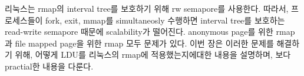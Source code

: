 \ifkor
리눅스는 rmap의 interval tree를 보호하기 위해 rw semapore를 사용한다. 
따라서, 프로세스들이 fork, exit, mmap를 simultaneosly 수행하면 interval tree를 보호하는
read-write semapore 때문에 scalability가 떨어진다.
anonymous page를 위한 rmap과 file mapped page을 위한 rmap 모두 문제가 있다.
이번 장은 이러한 문제를 해결하기 위해, 어떻게 LDU를 리눅스의 rmap에 적용했는지에대한 내용을 설명하며, 보다 practial한 내용을
다룬다.
\else

\fi





